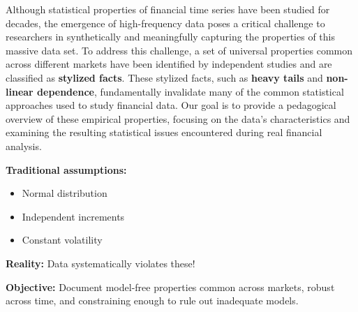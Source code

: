 \documentclass[final]{beamer}
\begin{document}
\begin{frame}[t]
\begin{columns}[t]
\begin{column}{.48\linewidth}
\begin{tcolorbox}[mybox, title=Motivation]
\large
Although statistical properties of financial time series have been studied for decades, the emergence of high-frequency data poses a critical challenge to researchers in synthetically and meaningfully capturing the properties of this massive data set.
To address this challenge, a set of universal properties common across different markets have been identified by independent studies and are classified as \textbf{stylized facts}.
These stylized facts, such as \textbf{heavy tails} and \textbf{non-linear dependence}, fundamentally invalidate many of the common statistical approaches used to study financial data.
Our goal is to provide a pedagogical overview of these empirical properties, focusing on the data's characteristics and examining the resulting statistical issues encountered during real financial analysis.



\end{tcolorbox}

\vspace{0.5cm}

\begin{tcolorbox}[mybox, title=Problem Statement]
\large
\textbf{Traditional assumptions:}
\begin{itemize}
\item Normal distribution
\item Independent increments  
\item Constant volatility
\end{itemize}

\vspace{0.2cm}
\textbf{Reality:} Data systematically violates these!

\vspace{0.2cm}
\textbf{Objective:} Document model-free properties common across markets, robust across time, and constraining enough to rule out inadequate models.
\end{tcolorbox}


\end{column}
\end{columns}
\end{frame}
\end{document}
